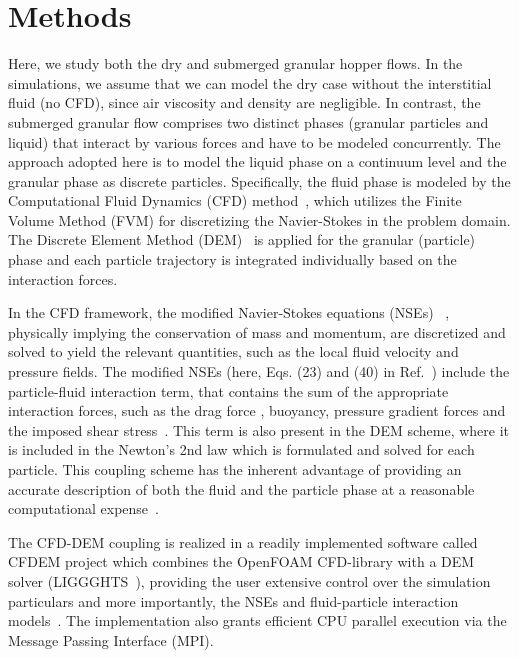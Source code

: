 \documentclass[twoside,twocolumn,9pt]{article}
\begin{document}
\section{Methods}

Here, we study both the dry and submerged granular hopper flows.
In the simulations, we assume that we can model the dry case without 
the interstitial fluid (no CFD), since  air viscosity and density are 
negligible.
In contrast, the submerged granular flow comprises two distinct 
phases (granular particles and liquid) that interact by various forces 
and have to be modeled concurrently. 
The approach adopted here is to model the liquid phase on a continuum 
level and the granular phase as discrete particles. Specifically, the 
fluid phase is modeled by the Computational Fluid Dynamics (CFD) 
method~\cite{ferziger2012computational}, which utilizes the Finite Volume 
Method (FVM) for discretizing the Navier-Stokes in the problem domain. 
The Discrete Element Method (DEM)~\cite{cundall1979discrete} is applied 
for the granular (particle) phase and each particle trajectory is 
integrated individually based on the interaction forces.

In the CFD framework, the modified Navier-Stokes equations (NSEs)
~\cite{anderson1967fluid}, physically implying the conservation of mass 
and momentum, are discretized and solved to yield the relevant quantities, 
such as the local fluid velocity and pressure fields. The modified NSEs 
(here, Eqs. (23) and (40) in Ref.~\cite{anderson1967fluid}) include the 
particle-fluid interaction term, that contains the sum of the appropriate 
interaction forces, such as the drag force \cite{DiFelice1994}, buoyancy, 
pressure gradient forces and the imposed shear stress~\cite{zhu2007discrete}. 
This term is also present in the DEM scheme, where it is included in the 
Newton's 2nd law which is formulated and solved for each particle. 
This coupling scheme has the inherent advantage of providing an accurate 
description of both the fluid and the particle phase at a reasonable 
computational expense~\cite{zhu2007discrete}.

The CFD-DEM coupling is realized in a readily implemented software called CFDEM project which combines
the OpenFOAM CFD-library with a DEM solver (LIGGGHTS~\cite{kloss2012models}), providing the user  extensive control over the simulation particulars and more importantly, the NSEs and fluid-particle interaction models~\cite{zhou2010discrete}. The implementation also grants efficient CPU parallel execution via the Message Passing Interface (MPI).
\end{document}
